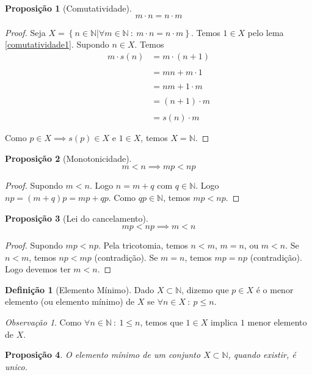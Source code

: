 \documentclass{article}
\theoremstyle{plain}
\newtheorem{prop}{Proposição}[section]
\theoremstyle{definition}
\newtheorem{definicao}{Definição}[section]
\theoremstyle{remark}
\newtheorem{obs}{Observação}[section]
\begin{document}
\begin{prop}[Comutatividade]
	$$m\cdot n = n \cdot m $$
\end{prop}
\begin{proof}
	Seja $X = \left\{n \in \mathbb{N} | \forall m \in \mathbb{N} \: : \:  m\cdot n = n\cdot m  \right\}$. Temos $1\in X$ pelo lema \ref{comutatividade1}. Supondo $n\in X$. Temos 
	 \begin{align*}
		 m\cdot s(n) &= m\cdot(n +1 )  \\~\\
		 &=mn + m\cdot1 \\~\\
		 &=nm + 1\cdot m \\~\\
		 &=(n+1)\cdot m  \\~\\
		 &=s(n)\cdot m \\~\\
	\end{align*}
	Como $p\in X\implies s(p) \in X $ e $1\in X$, temos $X = \mathbb{N}$.
\end{proof}
\begin{prop}[Monotonicidade]
	$$ m< n \implies  mp < np $$
\end{prop}
\begin{proof}
	Supondo $m<n$. Logo $n = m+q$ com $q\in \mathbb{N}$. Logo $np = (m+q)p = mp +qp$. Como $qp\in \mathbb{N}$, temos $mp < np$.
\end{proof}
\begin{prop}[Lei do cancelamento]
	$$ mp < np \implies  m < n $$
\end{prop}
\begin{proof}
	Supondo $mp < np$. Pela tricotomia, temos  $n<m$, $m=n$, ou $m < n$. Se $n<m$, temos $np < mp$ (contradição). Se $m = n$, temos $mp = np$ (contradição). Logo devemos ter $m <n$.

\end{proof}
\begin{definicao}[Elemento Mínimo]
	Dado $X\subset \mathbb{N}$, dizemo que $p\in X$ é o menor elemento (ou elemento mínimo) de $X$ se $\forall n\in X \: : \: p\leq n$.
\end{definicao}
\begin{obs}
	Como $\forall n\in \mathbb{N} \: : \: 1 \leq n$, temos que $1\in X$ implica $1$ menor elemento de $X$.
\end{obs}
\begin{prop}
	O elemento mínimo de um conjunto $X\subset \mathbb{N}$, quando existir, é unico.
\end{prop}
\end{document}
